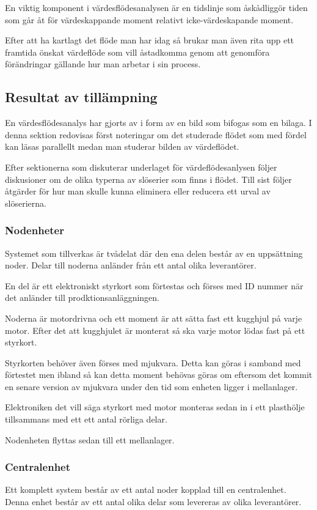 \documentclass{article}
\begin{document}
En viktig komponent i värdesflödesanalysen är en tidslinje som åskådliggör tiden som går åt för värdeskappande moment relativt icke-värdeskapande moment.

Efter att ha kartlagt det flöde man har idag så brukar man även rita upp ett framtida önskat värdeflöde som vill åstadkomma genom att genomföra förändringar gällande hur man arbetar i sin process.

\subsection*{Resultat av tillämpning}
En värdesflödesanalys har gjorts av i form av en bild som bifogas som en bilaga. I denna sektion redovisas först noteringar om det studerade flödet som med fördel kan läsas parallellt medan man studerar bilden av värdeflödet.

Efter sektionerna som diskuterar underlaget för värdeflödesanlysen följer diskusioner om de olika typerna av slöserier som finns i flödet. Till sist följer åtgärder för hur man skulle kunna eliminera eller reducera ett urval av slöserierna.

\subsubsection*{Nodenheter}
Systemet som tillverkas är tvådelat där den ena delen består av en uppsättning noder. Delar till noderna anländer från ett antal olika leverantörer.

En del är ett elektroniskt styrkort som förtestas och förses med ID nummer när det anländer till prodktionsanläggningen.

Noderna är motordrivna och ett moment är att sätta fast ett kugghjul på varje motor. Efter det att kugghjulet är monterat så ska varje motor lödas fast på ett styrkort.

Styrkorten behöver även förses med mjukvara. Detta kan göras i samband med förtestet men ibland så kan detta moment behövas göras om eftersom det kommit en senare version av mjukvara under den tid som enheten ligger i mellanlager.

Elektroniken det vill säga styrkort med motor monteras sedan in i ett plasthölje tillsammans med ett ett antal rörliga delar.

Nodenheten flyttas sedan till ett mellanlager.
  
\subsubsection*{Centralenhet}
Ett komplett system består av ett antal noder kopplad till en centralenhet. Denna enhet består av ett antal olika delar som levereras av olika leverantörer. 
\end{document}
